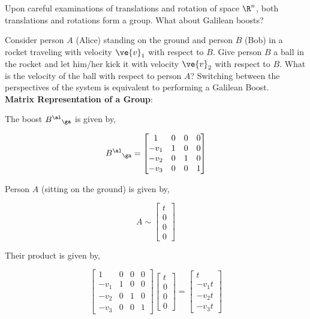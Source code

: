\documentclass{article}
\newcommand{\mtrx}[1]{
    \begin{bmatrix}
    #1
    \end{bmatrix}
}
\newcommand{\heading}[1]{\vspace{0.1in}\textbf{#1}:}
\begin{document}
Upon careful examinations of translations and rotation of space $\R^n$, both translations and rotations form a group. What about Galilean boosts? \\

\newcommand{\wrt}{with respect to }

Consider person $A$ (Alice) standing on the ground and person $B$ (Bob) in a rocket traveling with velocity $\ve{v}_1$ \wrt $B$. Give person $B$ a ball in the rocket and let him/her kick it with velocity $\ve{v}_2$ \wrt $B$. What is the velocity of the ball \wrt person $A$? Switching between the perspectives of the system is equivalent to performing a Galilean Boost. \\

\heading{Matrix Representation of a Group}

\begin{center}
\end{center}

The boost ${B^{\al}}_\ga$ is given by,

\[ {B^{\al}}_\ga = \mtrx{1 & 0 & 0 & 0 \\ -v_1 & 1 & 0 & 0 \\ -v_2 & 0 & 1 & 0 \\ -v_3 & 0 & 0 & 1} \]

Person $A$ (sitting on the ground) is given by,

\[ A \sim \mtrx{t \\ 0 \\ 0 \\ 0} \]

Their product is given by,

\[ \mtrx{1 & 0 & 0 & 0 \\ -v_1 & 1 & 0 & 0 \\ -v_2 & 0 & 1 & 0 \\ -v_3 & 0 & 0 & 1} \mtrx{t \\ 0 \\ 0 \\ 0} = \mtrx{t \\ -v_1t \\ -v_2t \\ -v_3t }\]
\end{document}
